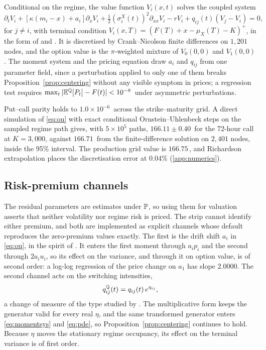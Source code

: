 Conditional on the regime, the value function $V_i(x,t)$ solves the coupled
system
\begin{equation}
  \partial_t V_i
  + \left[\kappa\left(m_i-x\right)+a_i\right]\partial_x V_i
  + \tfrac12\left(\sigma^X_i(t)\right)^2\partial_{xx}V_i
  - rV_i + q_{ij}(t)\left(V_j-V_i\right) = 0,
  \label{eq:pde}
\end{equation}
for $j\neq i$, with terminal condition $V_i(x,T)=\left(F(T)+x-\mu_X(T)-K\right)^{+}$, in the
form of \citet{BuffingtonElliott2002} and \citet{JobertRogers2006}. It is
discretised by Crank--Nicolson finite differences
\citep{BoyleDraviam2007,Huang2011} on $1{,}201$ nodes, and the option value is
the $\pi$-weighted mixture of $V_0(0,0)$ and $V_1(0,0)$. The moment system and
the pricing equation draw $a_i$ and $q_{ij}$ from one parameter field, since a
perturbation applied to only one of them breaks
Proposition~\ref{prop:centering} without any visible symptom in prices; a
regression test requires $\max_t|\mathbb{E}^{\mathbb{Q}}[P_t]-F(t)|<10^{-8}$\,\TRY{} under
asymmetric perturbations.

Put--call parity holds to $1.0\times10^{-6}$\,\TRY{} across the
strike--maturity grid. A direct simulation of \eqref{eq:ou} with exact
conditional Ornstein--Uhlenbeck steps on the sampled regime path gives, with
$5\times10^{5}$ paths, $166.11\pm0.40$\,\TRY{} for the 72-hour call at
$K=3{,}000$, against $166.71$\,\TRY{} from the finite-difference solution on
$2{,}401$ nodes, inside the 95\% interval. The production grid value is
$166.75$\,\TRY, and Richardson extrapolation places the discretisation error at
0.04\% (\ref{app:numerics}).

\subsection{Risk-premium channels}
\label{sec:premia}

The residual parameters are estimates under $\mathbb{P}$, so using them for valuation
asserts that neither volatility nor regime risk is priced. The strip cannot
identify either premium, and both are implemented as explicit channels whose
default reproduces the zero-premium values exactly. The first is the drift
shift $a_i$ in \eqref{eq:ou}, in the spirit of \citet{Janczura2014}. It enters
the first moment through $a_ip_i$ and the second through $2a_iu_i$, so its
effect on the variance, and through it on option value, is of second order: a
log-log regression of the price change on $a_1$ has slope $2.0000$. The second
channel acts on the switching intensities,
\begin{equation}
  q^{\mathbb{Q}}_{ij}(t)=q_{ij}(t)\,e^{\eta_{ij}},
  \label{eq:q2}
\end{equation}
a change of measure of the type studied by \citet{ElliottChanSiu2005}. The
multiplicative form keeps the generator valid for every real $\eta$, and the
same transformed generator enters \eqref{eq:momentsys} and \eqref{eq:pde}, so
Proposition~\ref{prop:centering} continues to hold. Because $\eta$ moves the
stationary regime occupancy, its effect on the terminal variance is of first
order.

